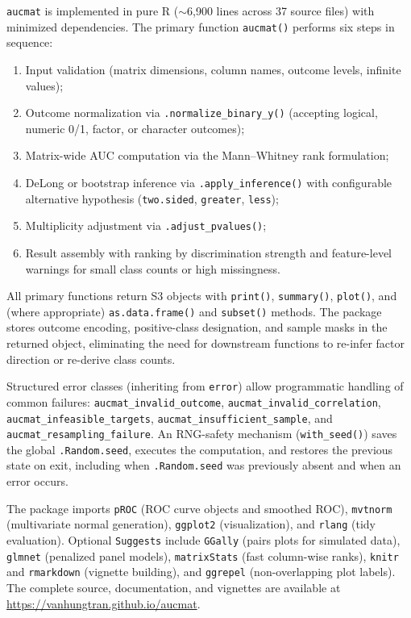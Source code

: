 \documentclass[11pt,a4paper]{article}
\begin{document}
\texttt{aucmat} is implemented in pure R ($\sim$6{,}900 lines across 37
source files) with minimized dependencies.  The primary function
\texttt{aucmat()} performs six steps in sequence:
\begin{enumerate}
  \item Input validation (matrix dimensions, column names, outcome levels,
        infinite values);
  \item Outcome normalization via \texttt{.normalize\_binary\_y()} (accepting
        logical, numeric 0/1, factor, or character outcomes);
  \item Matrix-wide AUC computation via the Mann--Whitney rank formulation;
  \item DeLong or bootstrap inference via \texttt{.apply\_inference()} with
        configurable alternative hypothesis (\texttt{two.sided},
        \texttt{greater}, \texttt{less});
  \item Multiplicity adjustment via \texttt{.adjust\_pvalues()};
  \item Result assembly with ranking by discrimination strength and
        feature-level warnings for small class counts or high missingness.
\end{enumerate}

All primary functions return S3 objects with \texttt{print()},
\texttt{summary()}, \texttt{plot()}, and (where appropriate)
\texttt{as.data.frame()} and \texttt{subset()} methods.  The package stores
outcome encoding, positive-class designation, and sample masks in the
returned object, eliminating the need for downstream functions to re-infer
factor direction or re-derive class counts.

Structured error classes (inheriting from \texttt{error}) allow programmatic
handling of common failures: \texttt{aucmat\_invalid\_outcome},
\texttt{aucmat\_invalid\_correlation}, \texttt{aucmat\_infeasible\_targets},
\texttt{aucmat\_insufficient\_sample}, and
\texttt{aucmat\_resampling\_failure}.  An RNG-safety mechanism
(\texttt{with\_seed()}) saves the global \texttt{.Random.seed}, executes the
computation, and restores the previous state on exit, including when
\texttt{.Random.seed} was previously absent and when an error occurs.

The package imports \texttt{pROC} (ROC curve objects and smoothed ROC),
\texttt{mvtnorm} (multivariate normal generation), \texttt{ggplot2}
(visualization), and \texttt{rlang} (tidy evaluation).  Optional
\texttt{Suggests} include \texttt{GGally} (pairs plots for simulated data),
\texttt{glmnet} (penalized panel models), \texttt{matrixStats} (fast
column-wise ranks), \texttt{knitr} and \texttt{rmarkdown} (vignette
building), and \texttt{ggrepel} (non-overlapping plot labels).  The complete
source, documentation, and vignettes are available at
\url{https://vanhungtran.github.io/aucmat}.
\end{document}
